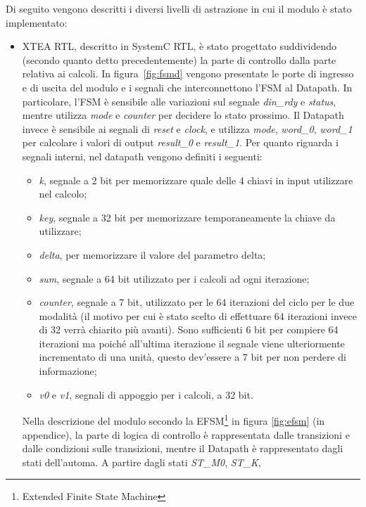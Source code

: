 \documentclass[]{IEEEtran}
\newcommand{\state}[1]{\textit{#1}}
\begin{document}
Di seguito vengono descritti i diversi livelli di astrazione in cui il modulo \`e stato implementato:
\begin{itemize}
    \item XTEA RTL, descritto in SystemC RTL, \`e stato progettato suddividendo (secondo quanto detto precedentemente) 
    la parte di controllo dalla parte relativa ai calcoli. In figura~\ref{fig:fsmd} vengono presentate le porte di 
    ingresso e di uscita del modulo e i segnali che interconnettono l'FSM al Datapath. In particolare, l'FSM è sensibile
    alle variazioni sul segnale \state{din\_rdy} e \state{status}, mentre utilizza \state{mode} e \state{counter} per 
    decidere lo stato prossimo. Il Datapath invece è sensibile ai segnali di \state{reset} e \state{clock}, e utilizza 
    \state{mode}, \state{word\_0}, \state{word\_1} per calcolare i valori di output \state{result\_0} e \state{result\_1}. 
    Per quanto riguarda i segnali interni, nel datapath vengono definiti i seguenti:
    \begin{itemize}
        \item \state{k}, segnale a 2 bit per memorizzare quale delle 4 chiavi in input utilizzare nel calcolo;
        \item \state{key}, segnale a 32 bit per memorizzare temporaneamente la chiave da utilizzare;
        \item \state{delta}, per memorizzare il valore del parametro delta;
        \item \state{sum}, segnale a 64 bit utilizzato per i calcoli ad ogni iterazione;
        \item \state{counter}, segnale a 7 bit, utilizzato per le 64 iterazioni del ciclo per le due modalità (il motivo 
        per cui è stato scelto di effettuare 64 iterazioni invece di 32 verrà chiarito più avanti). Sono sufficienti 6 
        bit per compiere 64 iterazioni ma poiché all'ultima iterazione il segnale viene ulteriormente incrementato di 
        una unità, questo dev'essere a 7 bit per non perdere di informazione;
        \item \state{v0} e \state{v1}, segnali di appoggio per i calcoli, a 32 bit.
    \end{itemize}
    Nella descrizione del modulo secondo la EFSM\footnote{Extended Finite State Machine} in figura \ref{fig:efsm} (in 
    appendice), la parte di logica di controllo \`e rappresentata dalle transizioni e dalle condizioni sulle transizioni, 
    mentre il Datapath \`e rappresentato dagli stati dell'automa. A partire dagli stati \state{ST\_M0}, \state{ST\_K}, 

\end{itemize}
\end{document}
